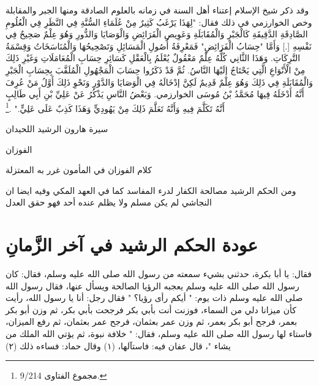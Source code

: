 وقد ذكر شيخ الإسلام إعتناء أهل السنة في زمانه بالعلوم الصادقة ومنها الجبر والمقابلة وخص الخوارزمي في ذلك فقال: 
"لِهَذَا يَرْغَبُ كَثِيرٌ مِنْ عُلَمَاءِ السُّنَّةِ فِي النَّظَرِ فِي الْعُلُومِ الصَّادِقَةِ الدَّقِيقَةِ كَالْجَبْرِ وَالْمُقَابَلَةِ وَعَوِيصِ الْفَرَائِضِ وَالْوَصَايَا وَالدُّورِ وَهُوَ عِلْمٌ صَحِيحٌ فِي نَفْسِهِ [.] وَأَمَّا "حِسَابُ الْفَرَائِضِ" فَمَعْرِفَةُ أُصُولِ الْمَسَائِلِ وَتَصْحِيحُهَا وَالْمُنَاسَخَاتُ وَقِسْمَةُ التَّرِكَاتِ. وَهَذَا الثَّانِي كُلُّهُ عِلْمٌ مَعْقُولٌ يُعْلَمُ بِالْعَقْلِ كَسَائِرِ حِسَابِ الْمُعَامَلَاتِ وَغَيْرِ ذَلِكَ مِنْ الْأَنْوَاعِ الَّتِي يَحْتَاجُ إلَيْهَا النَّاسُ. ثُمَّ قَدْ ذَكَرُوا حِسَابَ الْمَجْهُولِ الْمُلَقَّبَ بِحِسَابِ الْجَبْرِ وَالْمُقَابَلَةِ فِي ذَلِكَ وَهُوَ عِلْمٌ قَدِيمٌ لَكِنَّ إدْخَالَهُ فِي الْوَصَايَا وَالدَّوْرِ وَنَحْوِ ذَلِكَ أَوَّلُ مَنْ عُرِفَ أَنَّهُ أَدْخَلَهُ فِيهَا مُحَمَّدُ بْنُ مُوسَى الخوارزمي. وَبَعْضُ النَّاسِ يَذْكُرُ عَنْ عَلِيِّ بْنِ أَبِي طَالِبٍ أَنَّهُ تَكَلَّمَ فِيهِ وَأَنَّهُ تَعَلَّمَ ذَلِكَ مِنْ يَهُودِيٍّ وَهَذَا كَذِبٌ عَلَى عَلِيٍّ."
\href{https://shamela.ws/book/7289/4479#p2}{\faExternalLink} \cite{ibnTaimia_Majmoo}.\footnote{مجموع الفتاوى 9/214.}

سيرة هارون الرشيد
اللحيدان

الفوزان


كلام الفوزان في المأمون
غرر به المعتزلة

ومن الحكم الرشيد مصالحة الكفار لدرء المفاسد كما في العهد المكي
وفيه ايضا ان النجاشي لم يكن مسلم ولا  يظلم عنده أحد فهو حقق العدل



\section{عودة الحكم الرشيد في آخر الزَّمانِ}

فقال: يا أبا بكرة، حدثني بشيء سمعته من رسول الله صلى الله عليه وسلم، فقال: كان رسول الله صلى الله عليه وسلم يعجبه الرؤيا الصالحة ويسأل عنها، فقال رسول الله صلى الله عليه وسلم ذات يوم: " أيكم رأى رؤيا؟ " فقال رجل: أنا يا رسول الله، رأيت كأن ميزانا دلي من السماء، فوزنت أنت بأبي بكر فرجحت بأبي بكر، ثم وزن أبو بكر بعمر، فرجح أبو بكر بعمر، ثم وزن عمر بعثمان، فرجح عمر بعثمان، ثم رفع الميزان، فاستاء لها رسول الله صلى الله عليه وسلم، فقال: " خلافة نبوة، ثم يؤتي الله الملك من يشاء "، قال عفان فيه: فاستآلها، (١) وقال حماد: فساءه ذلك (٢)
\href{https://shamela.ws/book/25794/16870#p1}{\faExternalLink}


